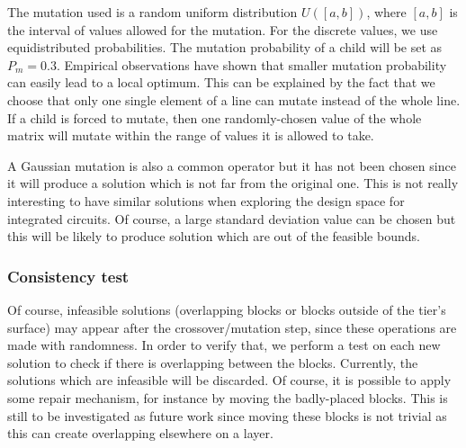 The mutation used is a random uniform distribution $U([a, b])$, where $[a, b]$ is the interval of values allowed for the mutation. For the discrete values, we use equidistributed probabilities. The mutation probability of a child will be set as $P_{m} = 0.3$. Empirical observations have shown that smaller mutation probability can easily lead to a local optimum. This can be explained by the fact that we choose that only one single element of a line can mutate instead of the whole line. If a child is forced to mutate, then one randomly-chosen value of the whole matrix will mutate within the range of values it is allowed to take.

A Gaussian mutation is also a common operator but it has not been chosen since it will produce a solution which is not far from the original one. This is not really interesting to have similar solutions when exploring the design space for integrated circuits. Of course, a large standard deviation value can be chosen but this will be likely to produce solution which are out of the feasible bounds.

\subsubsection{Consistency test}
Of course, infeasible solutions (overlapping blocks or blocks outside of the tier's surface) may appear after the crossover/mutation step, since these operations are made with randomness. In order to verify that, we perform a test on each new solution to check if there is overlapping between the blocks. Currently, the solutions which are infeasible will be discarded. Of course, it is possible to apply some repair mechanism, for instance by moving the badly-placed blocks. This is still to be investigated as future work since moving these blocks is not trivial as this can create overlapping elsewhere on a layer.

